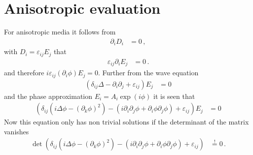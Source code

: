 \documentclass[a4paper,10pt]{revtex4-1}
\begin{document}
\section{Anisotropic evaluation}


For anisotropic media it follows from
\begin{align}
 \partial_i D_i &= 0\,,
\end{align}
with $D_i = \varepsilon_{ij} E_j$ that
\begin{align}
 \varepsilon_{ij} \partial_i E_j &= 0\,.
\end{align}
and therefore $i \varepsilon_{ij} (\partial_i \phi) E_j = 0$. Further from the wave equation
\begin{align}
 (\delta_{ij} \Delta - \partial_i \partial_j + \varepsilon_{ij}) E_j &= 0
\end{align}
and the phase approximation $E_i = A_i \exp(i \phi)$ it is seen that
\begin{align}
 (\delta_{ij} (i \Delta \phi - (\partial_k \phi)^2) - (i \partial_i \partial_j \phi + \partial_i \phi \partial_j \phi) + \varepsilon_{ij}) E_j &= 0
\end{align}
Now this equation only has non trivial solutions if the determinant of the matrix vanishes
\begin{align}
 \det(\delta_{ij} (i \Delta \phi - (\partial_k \phi)^2) 
 - (i \partial_i \partial_j \phi + \partial_i \phi \partial_j \phi)
 + \varepsilon_{ij}) &\stackrel{!}{=}0\,.
\end{align}
\end{document}
